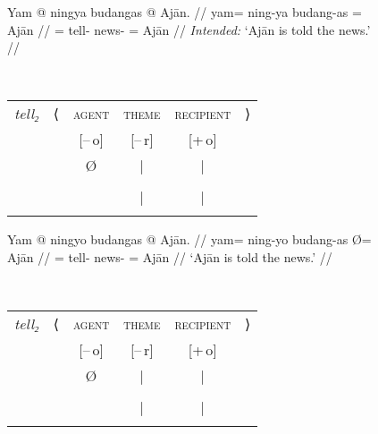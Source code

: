 \begin{figure}
\pex\label{ex:ditrpass}
\a\label{ex:ditrpass_pass1}%
\ljudge*\begin{minipage}[t]{.4\remaining}
\begingl
	\gla Yam @ ningya budangas {} @ Ajān. //
	\glb yam= ning-ya budang-as \Top= Ajān //
	\glc \DatT{}= tell-\TsgM{} news-\Parg{} \Top{}= Ajān //
	\glft \textit{Intended:} `Ajān is told the news.' //
\endgl
\end{minipage}
~
\begin{tabular}[t]{>{\itshape}l l c c c r}
tell₂
	& ⟨
	& \textsc{agent}
	& \textsc{theme}
	& \textsc{recipient}
	& ⟩
	\\
%
	& %
	& [–\,o]
	& [–\,r]
	& [+\,o]
	& %
	\\

%
	& %
	& Ø
	& |
	& |
	& %
	\\

%
	& %
	& %
	& \Obj
	& \Subj*
	& %
	\\

%
	& %
	& %
	& |
	& |
	& %
	\\

%
	& %
	& %
	& \fw{news}
	& \fw{Ajān}
	& %
	\\
\end{tabular}

\a\label{ex:ditrpass_pass2}%
\begin{minipage}[t]{.4\remaining}
\begingl
	\gla Yam @ ningyo budangas {} @ Ajān. //
	\glb yam= ning-yo budang-as Ø= Ajān //
	\glc \DatT{}= tell-\TsgN{} news-\Parg{} \Top{}= Ajān //
	\glft `Ajān is told the news.' //
\endgl
\end{minipage}
~
\begin{tabular}[t]{>{\itshape}l l c c c r}
tell₂
	& ⟨
	& \textsc{agent}
	& \textsc{theme}
	& \textsc{recipient}
	& ⟩
	\\
%
	& %
	& [–\,o]
	& [–\,r]
	& [+\,o]
	& %
	\\

%
	& %
	& Ø
	& |
	& |
	& %
	\\

%
	& %
	& %
	& \Subj
	& \Obj*
	& %
	\\

%
	& %
	& %
	& |
	& |
	& %
	\\

%
	& %
	& %
	& \fw{news}
	& \fw{Ajān}
	& %
	\\
\end{tabular}
\xe
\end{figure}

